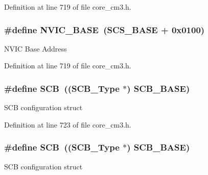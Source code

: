 Definition at line 719 of file core\+\_\+cm3.\+h.

\subsubsection[{\texorpdfstring{N\+V\+I\+C\+\_\+\+B\+A\+SE}{NVIC_BASE}}]{\setlength{\rightskip}{0pt plus 5cm}\#define N\+V\+I\+C\+\_\+\+B\+A\+SE~({\bf S\+C\+S\+\_\+\+B\+A\+SE} +  0x0100)}\hypertarget{group___c_m_s_i_s___c_m3__core__register_gaa0288691785a5f868238e0468b39523d}{}\label{group___c_m_s_i_s___c_m3__core__register_gaa0288691785a5f868238e0468b39523d}
N\+V\+IC Base Address 

Definition at line 719 of file core\+\_\+cm3.\+h.

\subsubsection[{\texorpdfstring{S\+CB}{SCB}}]{\setlength{\rightskip}{0pt plus 5cm}\#define S\+CB~(({\bf S\+C\+B\+\_\+\+Type} $\ast$)           {\bf S\+C\+B\+\_\+\+B\+A\+SE})}\hypertarget{group___c_m_s_i_s___c_m3__core__register_gaaaf6477c2bde2f00f99e3c2fd1060b01}{}\label{group___c_m_s_i_s___c_m3__core__register_gaaaf6477c2bde2f00f99e3c2fd1060b01}
S\+CB configuration struct 

Definition at line 723 of file core\+\_\+cm3.\+h.

\subsubsection[{\texorpdfstring{S\+CB}{SCB}}]{\setlength{\rightskip}{0pt plus 5cm}\#define S\+CB~(({\bf S\+C\+B\+\_\+\+Type} $\ast$)           {\bf S\+C\+B\+\_\+\+B\+A\+SE})}\hypertarget{group___c_m_s_i_s___c_m3__core__register_gaaaf6477c2bde2f00f99e3c2fd1060b01}{}\label{group___c_m_s_i_s___c_m3__core__register_gaaaf6477c2bde2f00f99e3c2fd1060b01}
S\+CB configuration struct 

